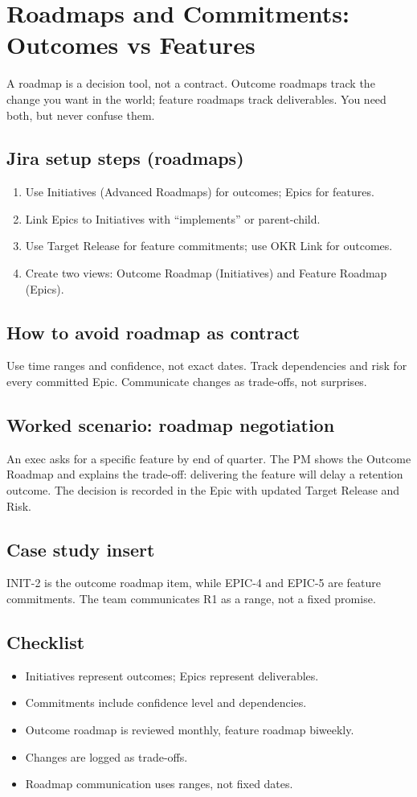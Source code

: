 \section{Roadmaps and Commitments: Outcomes vs Features}
A roadmap is a decision tool, not a contract. Outcome roadmaps track the change you want in the world; feature roadmaps track deliverables. You need both, but never confuse them.

\subsection{Jira setup steps (roadmaps)}
\begin{enumerate}
  \item Use Initiatives (Advanced Roadmaps) for outcomes; Epics for features.
  \item Link Epics to Initiatives with “implements” or parent-child.
  \item Use Target Release for feature commitments; use OKR Link for outcomes.
  \item Create two views: Outcome Roadmap (Initiatives) and Feature Roadmap (Epics).
\end{enumerate}

\subsection{How to avoid roadmap as contract}
Use time ranges and confidence, not exact dates. Track dependencies and risk for every committed Epic. Communicate changes as trade-offs, not surprises.

\subsection{Worked scenario: roadmap negotiation}
An exec asks for a specific feature by end of quarter. The PM shows the Outcome Roadmap and explains the trade-off: delivering the feature will delay a retention outcome. The decision is recorded in the Epic with updated Target Release and Risk.

\subsection{Case study insert}
INIT-2 is the outcome roadmap item, while EPIC-4 and EPIC-5 are feature commitments. The team communicates R1 as a range, not a fixed promise.
\subsection{Checklist}
\begin{itemize}
  \item Initiatives represent outcomes; Epics represent deliverables.
  \item Commitments include confidence level and dependencies.
  \item Outcome roadmap is reviewed monthly, feature roadmap biweekly.
  \item Changes are logged as trade-offs.
  \item Roadmap communication uses ranges, not fixed dates.
\end{itemize}

